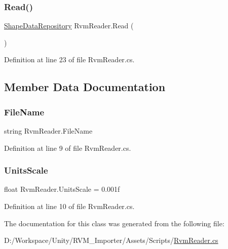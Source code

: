 \subsubsection{\texorpdfstring{Read()}{Read()}}
{\footnotesize\ttfamily \mbox{\hyperlink{class_shape_data_repository}{Shape\+Data\+Repository}} Rvm\+Reader.\+Read (\begin{DoxyParamCaption}{ }\end{DoxyParamCaption})}



Definition at line 23 of file Rvm\+Reader.\+cs.



\subsection{Member Data Documentation}
\mbox{\label{class_rvm_reader_aa3bd98b005bfb52c4a901a17dcd19ff1}} 
\subsubsection{\texorpdfstring{FileName}{FileName}}
{\footnotesize\ttfamily string Rvm\+Reader.\+File\+Name}



Definition at line 9 of file Rvm\+Reader.\+cs.

\mbox{\label{class_rvm_reader_a28634b9aaf8267d15af60dd3c5b2fbd9}} 
\subsubsection{\texorpdfstring{UnitsScale}{UnitsScale}}
{\footnotesize\ttfamily float Rvm\+Reader.\+Units\+Scale = 0.\+001f}



Definition at line 10 of file Rvm\+Reader.\+cs.



The documentation for this class was generated from the following file\+:\begin{DoxyCompactItemize}
\item 
D\+:/\+Workspace/\+Unity/\+R\+V\+M\+\_\+\+Importer/\+Assets/\+Scripts/\mbox{\hyperlink{_rvm_reader_8cs}{Rvm\+Reader.\+cs}}\end{DoxyCompactItemize}
